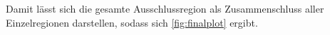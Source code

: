 Damit lässt sich die gesamte Ausschlussregion als Zusammenschluss aller Einzelregionen darstellen, sodass sich \autoref{fig:finalplot} ergibt.


